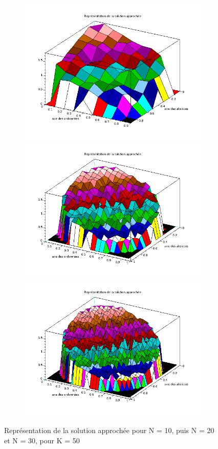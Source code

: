\documentclass[12pt, a4paper]{article}
\begin{document}
\begin{figure}[h!]
    \begin{center}
        \caption{Représentation de la solution approchée pour N = 10, puis N = 20 et N = 30, pour K = 50}
        \includegraphics[width=13cm,height=7cm]{ResultatsConvergences/ImageK5S10N10.png}
        \includegraphics[width=13cm,height=7cm]{ResultatsConvergences/ImageK5S10N20.png}
        \includegraphics[width=13cm,height=7cm]{ResultatsConvergences/ImageK5S10N30.png}
        \label{image50}
    \end{center}
\end{figure}
\end{document}
